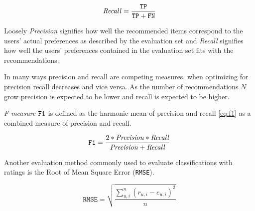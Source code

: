 \begin{equation} \label{eq:recall}
    \mathit{Recall} = \frac{\mathtt{TP}}{\mathtt{TP} + \mathtt{FN}}
\end{equation}

Loosely \textit{Precision} signifies how well the recommended items correspond to the users' actual preferences as described by the evaluation set and \textit{Recall} signifies how well the users' preferences contained in the evaluation set fits with the recommendations.

In many ways precision and recall are competing measures, when optimizing for precision recall decreases and vice versa.  As the number of recommendations $N$ grow precision is expected to be lower and recall is expected to be higher. \citep{hu2008collaborative}

\textit{F-measure} $\mathtt{F1}$ is defined as the harmonic mean of precision and recall \eqref{eq:f1} as a combined measure of precision and recall.

\begin{equation} \label{eq:f1}
    \mathtt{F1} = \frac{2 * \mathit{Precision} * \mathit{Recall}}{\mathit{Precision} + \mathit{Recall}}
\end{equation}

Another evaluation method commonly used to evaluate classifications with ratings is the Root of Mean Square Error (\texttt{RMSE}).
\citep{bobadilla2013recommender}

\begin{equation} \label{eq:rmse}
    \mathtt{RMSE} = \sqrt{\frac{\sum_{u, i}^n (r_{u, i} - e_{u, i})^2}{n}}
\end{equation}

